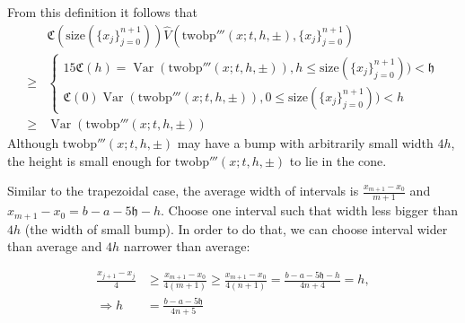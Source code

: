 \documentclass{iitthesis}
\DeclareMathOperator{\Var}{Var}
\theoremstyle{definition}
\theoremstyle{remark}
\begin{document}
From this definition it follows that
\begin{align*}
  &\mathfrak{C}(\text{size}(\{x_j\}_{j=0}^{n+1}))\widehat{V}(\text{twobp}'''(x;t,h,\pm),\{x_j\}_{j=0}^{n+1})\\
  \ge & \begin{cases} \displaystyle 15\mathfrak{C}(h)=\Var(\text{twobp}'''(x;t,h,\pm)), h \le \text{size}(\{x_j\}_{j=0}^{n+1})) <\mathfrak{h}\\[1ex]
                      \displaystyle \mathfrak{C}(0)\Var(\text{twobp}'''(x;t,h,\pm)), 0\le \text{size}(\{x_j\}_{j=0}^{n+1}))<h
        \end{cases}\\
  \ge & \Var(\text{twobp}'''(x;t,h,\pm))
\end{align*}
Although $\text{twobp}'''(x;t,h,\pm)$ may have a bump with arbitrarily small width $4h$, the height is small enough for $\text{twobp}'''(x;t,h,\pm)$ to lie in the cone.

Similar to the trapezoidal case, the average width of intervals is $\frac{x_{m+1}-x_{0}}{m+1}$ and $x_{m+1}-x_{0}=b-a-5\mathfrak{h}-h$. Choose one interval such that width less bigger than $4h$ (the width of small bump). In order to do that, we can choose interval wider than average and $4h$ narrower than average:

  \begin{align*}
    \frac{x_{j+1}-x_{j}}{4}&\ge\frac{x_{m+1}-x_{0}}{4(m+1)}\ge\frac{x_{m+1}-x_{0}}{4(n+1)}=\frac{b-a-5\mathfrak{h}-h}{4n+4}=h,\\
    \Rightarrow h&=\frac{b-a-5\mathfrak{h}}{4n+5}
  \end{align*}
\end{document}
